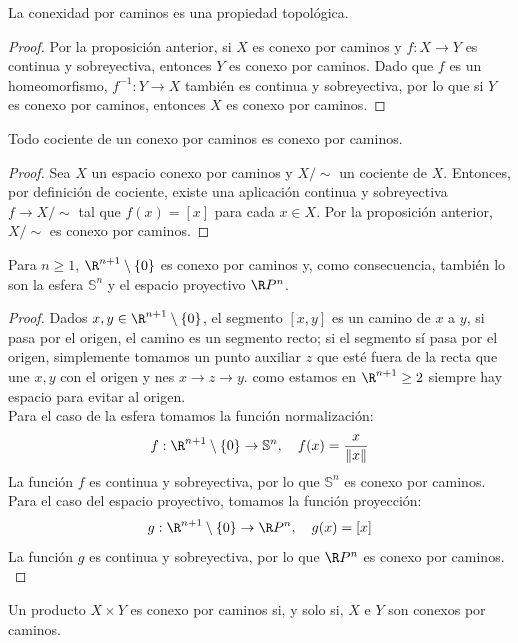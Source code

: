 \begin{corolario}
    La conexidad por caminos es una propiedad topológica.
\end{corolario}
\begin{proof}
    Por la proposición anterior, si $X$ es conexo por caminos y $f \colon X \to Y$ es continua y sobreyectiva, entonces $Y$ es conexo por caminos. Dado que $f$ es un homeomorfismo, $f^{-1} \colon Y \to X$ también es continua y sobreyectiva, por lo que si $Y$ es conexo por caminos, entonces $X$ es conexo por caminos.
\end{proof}
\begin{corolario}
    Todo cociente de un conexo por caminos es conexo por caminos.
\end{corolario}
\begin{proof}
    Sea $X$ un espacio conexo por caminos y $X/\sim$ un cociente de $X$. Entonces, por definición de cociente, existe una aplicación continua y sobreyectiva $f \to X/\sim$ tal que $f(x) = [x]$ para cada $x \in X$. Por la proposición anterior, $X/\sim$ es conexo por caminos.
\end{proof}
\begin{proposición}
    Para $n \geq 1$, $\R^{n+1} \setminus \{0\}$ es conexo por caminos y, como consecuencia, también lo son la esfera $\mathbb{S}^n$ y el espacio proyectivo $\R P^n$.
\end{proposición}
\begin{proof}
    Dados $x, y \in \R^{n+1} \setminus \{0\}$, el segmento $[x, y]$ es un camino de $x$ a $y$, si pasa por el origen, el camino es un segmento recto; si el segmento sí pasa por el origen, simplemente tomamos un punto auxiliar $z$ que esté fuera de la recta que une $x, y$ con el origen y nes $x \to z \to y$. como estamos en $\R^{n+1} \geq 2$ siempre hay espacio para evitar al origen. \\
    Para el caso de la esfera tomamos la función normalización: 
    $$f: \R^{n+1} \setminus \{0\} \to \mathbb{S}^n, \quad f(x) = \frac{x}{\|x\|}$$
    La función $f$ es continua y sobreyectiva, por lo que $\mathbb{S}^n$ es conexo por caminos. Para el caso del espacio proyectivo, tomamos la función proyección:
    $$g: \R^{n+1} \setminus \{0\} \to \R P^n, \quad g(x) = [x]$$
    La función $g$ es continua y sobreyectiva, por lo que $\R P^n$ es conexo por caminos. \\ 
\end{proof}
\begin{proposición}
    Un producto $X \times Y$ es conexo por caminos si, y solo si, $X$ e $Y$ son conexos por caminos.
\end{proposición}

